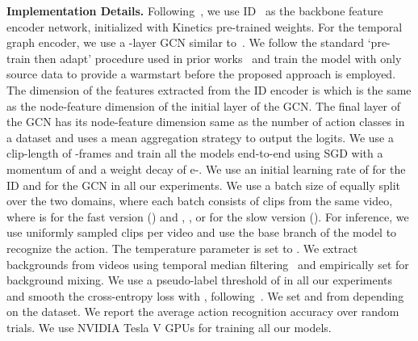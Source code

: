 \textbf{Implementation Details.}
Following~\cite{choi2020shuffle}, we use ID~\cite{carreira2017quo} as the backbone feature encoder network, initialized with Kinetics pre-trained weights. For the temporal graph encoder, we use a -layer GCN similar to~\cite{wang2018videos}. We follow the standard `pre-train then adapt' procedure used in prior works~\cite{tzeng2017adversarial,choi2020shuffle} and train the model with only source data to provide a warmstart before the proposed approach is employed. The dimension of the features extracted from the ID encoder is  which is the same as the node-feature dimension of the initial layer of the GCN. The final layer of the GCN has its node-feature dimension same as the number of action classes in a dataset and uses a mean aggregation strategy to output the logits. We use a clip-length of -frames and train all the models end-to-end using SGD with a momentum of  and a weight decay of e-. We use an initial learning rate of  for the ID and  for the GCN in all our experiments. We use a batch size of  equally split over the two domains, where each batch consists of  clips from the same video, where  is  for the fast version () and , , or  for the slow version (). For inference, we use  uniformly sampled clips per video and use the base branch of the model to recognize the action.
The temperature parameter is set to . We extract backgrounds from videos using temporal median filtering~\cite{piccardi2004background} and empirically set  for background mixing. We use a pseudo-label threshold of  in all our experiments and smooth the cross-entropy loss with , following~\cite{szegedy2016rethinking, muller2019does}. We set  and  from  depending on the dataset. We report the average action recognition accuracy over  random trials. 
We use  NVIDIA Tesla V GPUs for training all our models.


